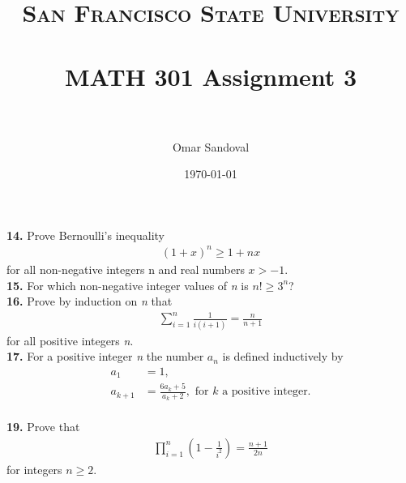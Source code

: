 \documentclass[paper=letter, fontsize=11pt]{scrartcl} %
\title{	
\normalfont \normalsize 
\textsc{San Francisco State University} \\ [25pt]
\horrule{0.5pt} \\[0.4cm] %
\huge MATH 301 Assignment 3  \\ %
\horrule{2pt} \\[0.5cm] %
}
\author{Omar Sandoval}
\date{\normalsize\today}
\begin{document}
\maketitle
\textbf{14.} Prove Bernoulli's inequality
\begin{align*}
	(1+x)^n \ge 1 + nx
\end{align*}
for all non-negative integers n and real numbers $x > -1$. \\

\textbf{15.} For which non-negative integer values of \textit{n} is $n! \ge 3^n$? \\

\textbf{16.} Prove by induction on \textit{n} that
\begin{align*}
	\sum_{i=1}^{n} \frac{1}{i(i+1)} = \frac{n}{n+1}
\end{align*}
for all positive integers \textit{n}. \\

\textbf{17.} For a positive integer \textit{n} the number $a_n$ is defined inductively by
\begin{align*}
	a_1 &= 1, \\
	a_{k+1} &= \frac{6a_k + 5}{a_k + 2}, \text{  for } k \text{ a positive integer.} \\
\end{align*}

\textbf{19.} Prove that 
\begin{align*}
	\prod_{i=1}^n (1 - \frac{1}{i^2}) = \frac{n + 1}{2n}
\end{align*}
for integers $n \ge 2$.
\end{document}
